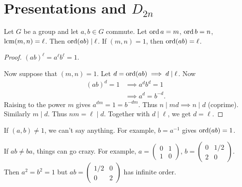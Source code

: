 
\section{Presentations and $D_{2n}$} \label{sec:groups:pres}

\begin{lemma}
    Let $G$ be a group and let $a, b \in G$ commute.
    Let $\operatorname{ord} a = m$, $\operatorname{ord} b = n$, $\operatorname{lcm}(m, n) = \ell$.
    Then $\operatorname{ord}(ab) \mid \ell$.
    If $(m, n) = 1$, then $\operatorname{ord}(ab) = \ell$.
\end{lemma}
\begin{proof}
    $(ab)^\ell = a^\ell b^\ell = 1$.

    Now suppose that $(m, n) = 1$.
    Let $d = \operatorname{ord}(ab) \implies d \mid \ell$.
    Now \begin{align*}
        (ab)^d = 1 &\implies a^d b^d = 1 \\
        &\implies a^d = b^{-d}.
    \end{align*}
    Raising to the power $m$ gives $a^{dm} = 1 = b^{-dm}$.
    Thus $n \mid m d \implies n \mid d$ (coprime).
    Similarly $m \mid d$.
    Thus $nm = \ell \mid d$.
    Together with $d \mid \ell$, we get $d = \ell$.
\end{proof}

\begin{examples}
    \item If $(a, b) \ne 1$, we can't say anything.
        For example, $b = a^{-1}$ gives $\operatorname{ord}(ab) = 1$.
    \item If $ab \ne ba$, things can go crazy.
        For example, $a = \begin{pmatrix}
            0 & 1 \\
            1 & 0
        \end{pmatrix}$, $b = \begin{pmatrix}
            0 & 1 / 2 \\
            2 & 0
        \end{pmatrix}$.
        Then $a^2 = b^2 = 1$ but $ab = \begin{pmatrix}
            1 / 2 & 0 \\
            0 & 2
        \end{pmatrix}$ has infinite order.
\end{examples}

\begin{definition}[presentation] \label{def:groups:pres}
    
\end{definition}

